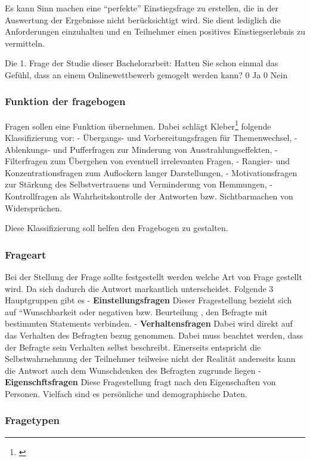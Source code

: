 Es kann Sinn machen eine ``perfekte'' Einstiegsfrage zu erstellen, die
in der Auswertung der Ergebnisse nicht berücksichtigt wird. Sie dient
lediglich die Anforderungen einzuhalten und en Teilnehmer einen
positives Einstiegserlebnis zu vermitteln.

Die 1. Frage der Studie dieser Bachelorarbeit: Hatten Sie schon einmal
das Gefühl, dass an einem Onlinewettbewerb gemogelt werden kann? 0 Ja 0
Nein

\subsubsection{Funktion der fragebogen}\label{funktion-der-fragebogen}

Fragen sollen eine Funktion übernehmen. Dabei schlägt Kleber\footnote{\autocite{kleber92}}
folgende Klassifizierung vor: - Übergangs- und Vorbereitungsfragen für
Themenwechsel, - Ablenkungs- und Pufferfragen zur Minderung von
Ausstrahlungseffekten, - Filterfragen zum Übergehen von eventuell
irrelevanten Fragen, - Rangier- und Konzentrationsfragen zum Auflockern
langer Darstellungen, - Motivationsfragen zur Stärkung des
Selbstvertrauens und Verminderung von Hemmungen, - Kontrollfragen als
Wahrheitskontrolle der Antworten bzw. Sichtbarmachen von Widersprüchen.

Diese Klassifizierung soll helfen den Fragebogen zu gestalten.

\subsubsection{Frageart}\label{frageart}

Bei der Stellung der Frage sollte festgestellt werden welche Art von
Frage gestellt wird. Da sich dadurch die Antwort markantlich
unterscheidet. Folgende 3 Hauptgruppen gibt es -
\textbf{Einstellungsfragen} Dieser Fragestellung bezieht sich auf
``Wunschbarkeit oder negativen bzw. Beurteilung , den Befragte mit
bestimmten Statements verbinden. - \textbf{Verhaltensfragen} Dabei wird
direkt auf das Verhalten des Befragten bezug genommen. Dabei muss
beachtet werden, dass der Befragte sein Verhalten selbst beschreibt.
Einerseits entspricht die Selbstwahrnehmung der Teilnehmer teilweise
nicht der Realität anderseits kann die Antwort auch dem Wunschdenken des
Befragten zugrunde liegen - \textbf{Eigenschftsfragen} Diese
Fragestellung fragt nach den Eigenschaften von Personen. Vielfach sind
es persönliche und demographische Daten.

\subsubsection{Fragetypen}\label{fragetypen}

